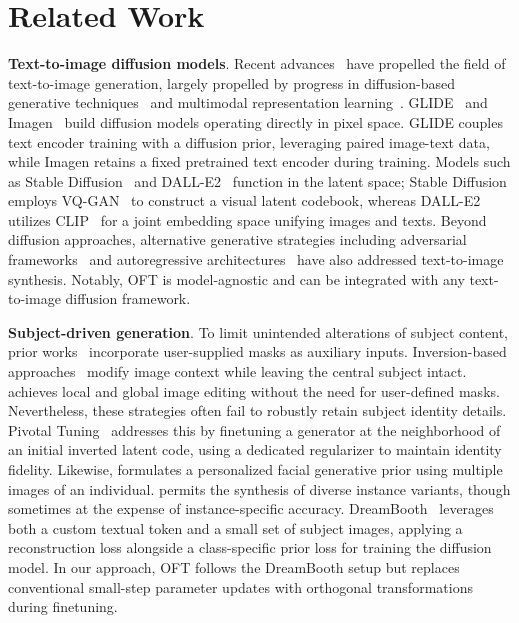 \section{Related Work}

\textbf{Text-to-image diffusion models}. Recent advances~\cite{saharia2022photorealistic,ramesh2022hierarchical,rombach2022high,gu2022vector,nichol2022glide} have propelled the field of text-to-image generation, largely propelled by progress in diffusion-based generative techniques~\cite{ho2020denoising,song2021score,song2021denoising,dhariwal2021diffusion} and multimodal representation learning~\cite{su2020vlbert,lu2019vilbert,radford2021learning,wang2021simvlm,li2022blip,li2023blip,alayrac2022flamingo,schuhmann2022laion}. GLIDE~\cite{nichol2022glide} and Imagen~\cite{saharia2022photorealistic} build diffusion models operating directly in pixel space. GLIDE couples text encoder training with a diffusion prior, leveraging paired image-text data, while Imagen retains a fixed pretrained text encoder during training. Models such as Stable Diffusion~\cite{rombach2022high} and DALL-E2~\cite{ramesh2022hierarchical} function in the latent space; Stable Diffusion employs VQ-GAN~\cite{esser2021taming} to construct a visual latent codebook, whereas DALL-E2 utilizes CLIP~\cite{radford2021learning} for a joint embedding space unifying images and texts. Beyond diffusion approaches, alternative generative strategies including adversarial frameworks~\cite{reed2016generative,zhang2017stackgan,xu2018attngan,li2019controllable} and autoregressive architectures~\cite{ramesh2021zero,ding2021cogview,wu2022nuwa,yuscaling} have also addressed text-to-image synthesis. Notably, OFT is model-agnostic and can be integrated with any text-to-image diffusion framework.

\textbf{Subject-driven generation}. To limit unintended alterations of subject content, prior works~\cite{avrahami2022blended,nichol2022glide} incorporate user-supplied masks as auxiliary inputs. Inversion-based approaches~\cite{choi2021ilvr,dhariwal2021diffusion,ramesh2022hierarchical,gal2022image} modify image context while leaving the central subject intact. \cite{hertz2022prompt} achieves local and global image editing without the need for user-defined masks. Nevertheless, these strategies often fail to robustly retain subject identity details. Pivotal Tuning~\cite{roich2022pivotal} addresses this by finetuning a generator at the neighborhood of an initial inverted latent code, using a dedicated regularizer to maintain identity fidelity. Likewise, \cite{nitzan2022mystyle} formulates a personalized facial generative prior using multiple images of an individual. \cite{casanova2021instance} permits the synthesis of diverse instance variants, though sometimes at the expense of instance-specific accuracy. DreamBooth~\cite{ruiz2023dreambooth} leverages both a custom textual token and a small set of subject images, applying a reconstruction loss alongside a class-specific prior loss for training the diffusion model. In our approach, OFT follows the DreamBooth setup but replaces conventional small-step parameter updates with orthogonal transformations during finetuning.

